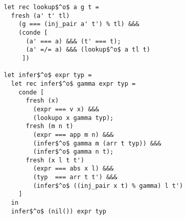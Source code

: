 \begin{lstlisting}
   let rec lookup$^o$ a g t =
     fresh (a' t' tl)
       (g === (inj_pair a' t') % tl) &&&
       (conde [
         (a' === a) &&& (t' === t);
         (a' =/= a) &&& (lookup$^o$ a tl t)
        ])

   let infer$^o$ expr typ =
     let rec infer$^o$ gamma expr typ =
       conde [
         fresh (x)
           (expr === v x) &&&
           (lookupo x gamma typ);
         fresh (m n t)
           (expr === app m n) &&&
           (infer$^o$ gamma m (arr t typ)) &&&
           (infer$^o$ gamma n t);
         fresh (x l t t')
           (expr === abs x l) &&&
           (typ  === arr t t') &&&
           (infer$^o$ ((inj_pair x t) % gamma) l t')
       ]
     in
     infer$^o$ (nil()) expr typ
\end{lstlisting}

